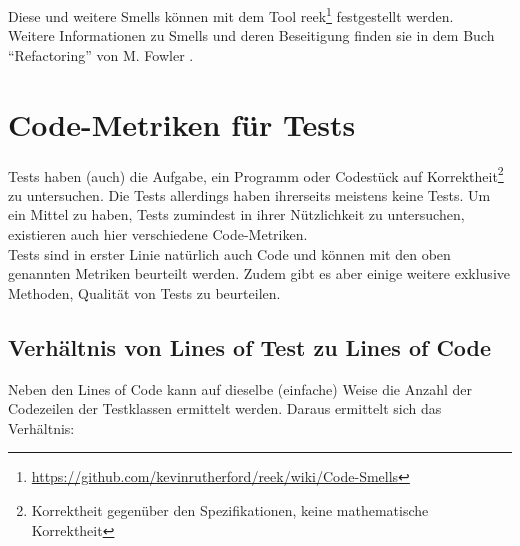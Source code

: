 Diese und weitere Smells können mit dem Tool reek\footnote{\url{https://github.com/kevinrutherford/reek/wiki/Code-Smells}} festgestellt werden.\\
Weitere Informationen zu Smells und deren Beseitigung finden sie in dem Buch "`Refactoring"' von M. Fowler \citep{fowler_refactoring_1999}.

\section{Code-Metriken für Tests}
\label{sec:metrics}
Tests haben (auch) die Aufgabe, ein Programm oder Codestück auf Korrektheit\footnote{Korrektheit gegenüber den Spezifikationen, keine mathematische Korrektheit} zu untersuchen. Die Tests allerdings haben ihrerseits meistens keine Tests. Um ein Mittel zu haben, Tests zumindest in ihrer Nützlichkeit zu untersuchen, existieren auch hier verschiedene Code-Metriken.\\
Tests sind in erster Linie natürlich auch Code und können mit den oben genannten Metriken beurteilt werden. Zudem gibt es aber einige weitere exklusive Methoden, Qualität von Tests zu beurteilen.

\subsection{Verhältnis von Lines of Test zu Lines of Code}
Neben den Lines of Code kann auf dieselbe (einfache) Weise die Anzahl der Codezeilen der Testklassen ermittelt werden. Daraus ermittelt sich das Verhältnis:


